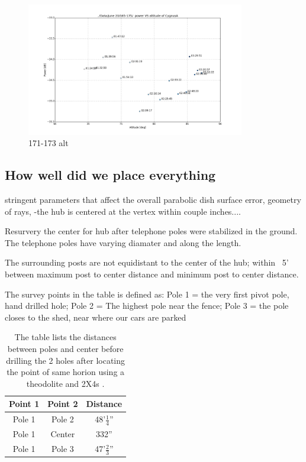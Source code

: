 \documentclass[preprint]{aastex}  %
\begin{document}
\begin{figure}[H]
	\begin{center}
	\includegraphics[width =0.85\textwidth]{spectra_plots/171173altdB}
	\caption{171-173 alt
\label{Fig:171173alt} }
	\end{center}
\end{figure}
\clearpage

\subsection{How well did we place everything}
stringent parameters that affect the overall parabolic dish surface error, geometry of rays, 
-the hub is centered at the vertex within couple inches....

Resurvery the center for hub after telephone poles were stabilized in the ground. The telephone poles have varying diamater and along the length. 

The surrounding posts are not equidistant to the center of the hub; within ~5' between maximum post to center distance and minimum post to center distance.

The survey points in the table is defined as:
Pole 1 = the very first pivot pole, hand drilled hole; 
Pole 2 = The highest pole near the fence; 
Pole 3 = the pole closes to the shed, near where our cars are parked


\begin{table}[!h]
\centering
\begin{tabular}{|c|c|c|} \hline

Point 1 & Point 2 & Distance \\ \hline
Pole 1 & Pole 2 & 48'$\frac{1}{4}$'' \\ \hline
Pole 1 & Center & 332'' \\ \hline
Pole 1 & Pole 3 & 47'$\frac{2}{3}$'' \\ \hline

\end{tabular}
\caption{The table lists the distances between poles and center before drilling the 2 holes after locating 
the point of same horion using a theodolite and 2X4s \label{Tab:survey_dist_b4_2holes}.}
\end{table}
\end{document}
